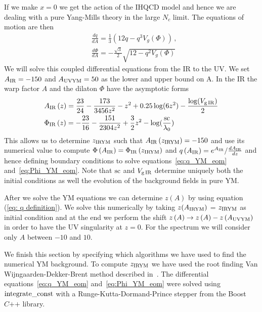 \documentclass[a4paper,12pt]{article}
\begin{document}
If we make $x = 0$ we get the action of the IHQCD model and hence we are dealing with a pure Yang-Mills theory in the large $N_c$ limit. The equations of motion are then
\begin{align}
&\frac{dq}{dA} = \frac{1}{3} \left( 12 q - q^3 V_g \left(\Phi\right) \right) \, , \label{eq:q_YM_eom} \\
&\frac{d\Phi}{dA} = - \frac{\sqrt{3}}{2} \sqrt{12 - q^2 V_g\left(\Phi\right)} \label{eq:Phi_YM_eom}
\end{align}
We will solve this coupled differential equations from the IR to the UV. We set $A_{\rm{IR}} = -150$ and $A_{\rm{UVYM}} = 50$ as the lower and upper bound on A. In the IR the warp factor $A$ and the dilaton $\Phi$ have the asymptotic forms
\begin{align}
&A_{\rm{IR}} \left(z\right) = \frac{23}{24} - \frac{173}{3456 z^2} - z^2 + 0.25 \log(6 z^2) - \frac{\log(V_{\rm{g\,IR}})}{2} \\
&\Phi_{\rm{IR}} \left(z \right) = - \frac{23}{16} - \frac{151}{2304 z^2} + \frac{3}{2} z^2 - \log(\frac{\rm{sc}}{\lambda_0})
\label{eq: YM fields IR asymptotics}
\end{align}
This allows us to determine $z_{\rm{IRYM}}$ such that $A_{\rm{IR}}\left(z_{\rm{IRYM}}\right) = -150$ and use its numerical value to compute $\Phi\left(A_{\rm{IR}}\right) = \Phi_{\rm{IR}} \left( z_{\rm{IRYM}}\right)$ and $q\left(A_{\rm{IR}}\right) = e^{A_{\rm{IR}}} / \frac{dA_{\rm{IR}}}{d z} $ and hence defining boundary conditions to solve equations~\ref{eq:q_YM_eom} and~\ref{eq:Phi_YM_eom}. Note that $\rm{sc}$ and $V_{\rm{g\,IR}}$ determine uniquely both the initial conditions as well the evolution of the background fields in pure YM.

After we solve the YM equations we can determine $z\left(A\right)$ by using equation (\ref{eq: q definition}). We solve this numerically by taking $z(A_{\rm{IRYM}})$ = $z_{\rm{IRYM}}$ as initial condition and at the end we perform the shift $z\left(A\right) \to z\left(A\right) - z\left(A_{\rm{UVYM}} \right) $ in order to have the UV singularity at $z = 0$. For the spectrum we will consider only  $A$ between $-10$ and $10$.

We finish this section by specifying which algorithms we have used to find the numerical YM background. To compute $z_{\rm{IRYM}}$ we have used the root finding Van Wijngaarden-Dekker-Brent method described in~\cite{10.5555/1403886}. The differential equations~\ref{eq:q_YM_eom} and~\ref{eq:Phi_YM_eom} were solved using $\rm{integrate\_const}$ with a Runge-Kutta-Dormand-Prince stepper from the Boost $C\texttt{++}$ library.
\end{document}

